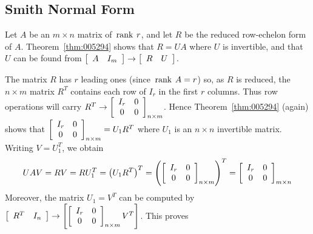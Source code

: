 \subsection*{Smith Normal Form}

Let $A$ be an $m \times n$ matrix of $\thinspace\operatorname{rank \medspace}r$, and let $R$ be the reduced row-echelon form of $A$. Theorem~\ref{thm:005294} shows that $R = UA$ where $U$ is invertible, and that $U$ can be found from $\left[ \begin{array}{cc}
A & I_{m}
\end{array} \right] \rightarrow \left[ \begin{array}{cc}
R & U
\end{array} \right]$.

The matrix $R$ has $r$ leading ones (since $\thinspace\operatorname{rank \medspace}A = r$) so, as $R$ is reduced, the $n \times m$ matrix $R^{T}$ contains each row of $I_{r}$ in the first $r$ columns. Thus row operations will carry $R^{T} \rightarrow \left[ \begin{array}{cc}
I_{r} & 0 \\
0 & 0
\end{array} \right]_{n \times m}$. Hence Theorem~\ref{thm:005294} (again) shows that $\left[ \begin{array}{cc}
 I_{r} & 0 \\
 0 & 0
 \end{array} \right]_{n \times m} = U_{1}R^{T}$
 where $U_{1}$ is an $n \times n$ invertible matrix. Writing $V = U_{1}^{T}$, we obtain
\begin{equation*}
UAV = RV = RU_{1}^{T} = \left(U_{1}R^{T}\right)^{T} = \left( \left[ \begin{array}{cc}
I_{r} & 0 \\
0 & 0
\end{array} \right]_{n \times m} \right)^{T} = \left[ \begin{array}{cc}
I_{r} & 0 \\
0 & 0
\end{array} \right]_{m \times n}
\end{equation*}
Moreover, the matrix $U_{1} = V^{T}$ can be computed by $\left[ \begin{array}{cc}
R^{T} & I_{n}
\end{array} \right] \rightarrow \left[ \left[ \begin{array}{cc}
I_{r} & 0 \\
0 & 0
\end{array} \right]_{n \times m} V^{T} \right]$.
 This proves


